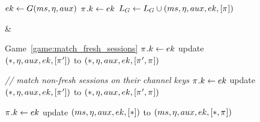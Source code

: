 \begin{figure}
\begin{leftfullpage}
\begin{adjustbox}{tabular={cc},Trim=0.9ex 0 0 0, width=\textwidth}
\begin{adjustbox}{minipage=[t]{\codewidth},fbox}
\begin{algorithmic}[1]
			\color{black}
			
			\Else  
				\State {}
				\State $ek \gets G(ms, \eta, aux)$\label{alg:line:send_game_hops_RO_call}
				\State $\oracle.\key \gets ek$
				\State $L_G \gets L_G \cup (ms, \nonce, aux, ek, [\oracle]) $
			\EndIf
			
		\end{algorithmic}
	\end{adjustbox}	
	
	&	
	
	\begin{adjustbox}{minipage=[t][]{\codewidth},fbox}
	
		\begin{algorithmic}[1]
			
			\Statex 
			\Comment Game~\ref{game:match_fresh_sessions}
			\color{black}
			\State {}
				\State $\oracle.\key \gets ek$
				\State update $(*, \nonce, aux, ek, [\oracle'])$ to $(*, \nonce, aux, ek, [\oracle', \oracle])$
		
			\color{hidecode}
		
			\State \hspace*{-\algorithmicindent} \textcolor{hidecode}{\emph{// match non-fresh sessions on their channel keys}}		
				\State $\oracle.\key \gets ek$
				\State update $(*, \nonce, aux, ek, [\oracle'])$ to $(*, \nonce, aux, ek, [\oracle', \oracle])$
			
			\color{black}
			\vspace{2.26pt}
		
			\State \hspace*{-\algorithmicindent} 
				\State $\oracle.\key \gets ek$
				\State update $(ms, \eta, aux, ek, [*])$ to $(ms, \nonce, aux, ek, [*,\oracle])$
			

\end{algorithmic}
\end{adjustbox}
\end{adjustbox}
\end{leftfullpage}
\end{figure}
